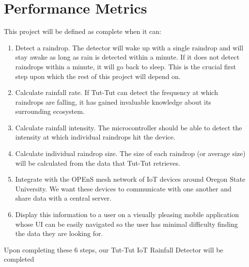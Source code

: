 \documentclass[letterpaper,10pt]{article}
\begin{document}
\section{Performance Metrics}
This project will be defined as complete when it can:
\begin{enumerate}
    \item Detect a raindrop. The detector will wake up with a single raindrop and will stay awake as long as rain is detected within a minute. If it does not detect raindrops within a minute, it will go back to sleep. This is the crucial first step upon which the rest of this project will depend on.
    \item Calculate rainfall rate. If Tut-Tut can detect the frequency at which raindrops are falling, it has gained invaluable knowledge about its surrounding ecosystem.
    \item Calculate rainfall intensity. The microcontroller should be able to detect the intensity at which individual raindrops hit the device.
    \item Calculate individual raindrop size. The size of each raindrop (or average size) will be calculated from the data that Tut-Tut retrieves. 
    \item Integrate with the OPEnS mesh network of IoT devices around Oregon State University. We want these devices to communicate with one another and share data with a central server.
    \item Display this information to a user on a visually pleasing mobile application whose UI can be easily navigated so the user has minimal difficulty finding the data they are looking for.
\end{enumerate}

Upon completing these 6 steps, our Tut-Tut IoT Rainfall Detector will be completed



\end{document}
